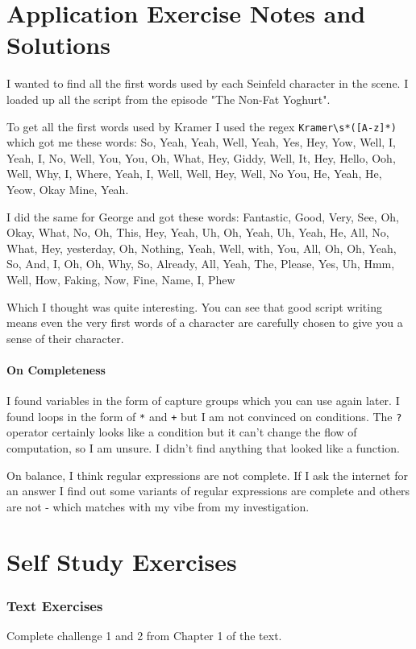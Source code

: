 \documentclass[twoside=false, DIV=14]{scrartcl}
\begin{document}
\newpage
\part*{Application Exercise Notes and Solutions}
I wanted to find all the first words used by each Seinfeld character in the scene.  I loaded up all the script from the episode "The Non-Fat Yoghurt".

To get all the first words used by Kramer I used the regex \verb|Kramer\s*([A-z]*)| which got me these words: So, Yeah, Yeah, Well, Yeah, Yes, Hey, Yow, Well, I, Yeah, I, No, Well, You, You, Oh, What, Hey, Giddy, Well, It, Hey, Hello, Ooh, Well, Why, I, Where, Yeah, I, Well, Well, Hey, Well, No
You, He, Yeah, He, Yeow, Okay
Mine, Yeah.

I did the same for George and got these words: Fantastic, Good, Very, See, Oh, Okay, What, No, Oh, This, Hey, Yeah, Uh, Oh, Yeah, Uh, Yeah, He, All, No, What, Hey, yesterday, Oh, Nothing, Yeah, Well, with, You, All, Oh, Oh, Yeah, So, And, I, Oh, Oh, Why, So, Already, All, Yeah, The, Please, Yes, Uh, Hmm, Well, How, Faking, Now, Fine, Name, I, Phew

Which I thought was quite interesting.  You can see that good script writing means even the very first words of a character are carefully chosen to give you a sense of their character.  

\subsection*{On Completeness}
I found variables in the form of capture groups which you can use again later.  I found loops in the form of \verb|*| and \verb|+| but I am not convinced on conditions.  The \verb|?| operator certainly looks like a condition but it can't change the flow of computation, so I am unsure.  I didn't find anything that looked like a function.

On balance, I think regular expressions are not complete.  If I ask the internet for an answer I find out some variants of regular expressions are complete and others are not - which matches with my vibe from my investigation.
\newpage
\part*{Self Study Exercises}
\section*{Text Exercises}
Complete challenge 1 and 2 from  Chapter 1 of the text.
\end{document}
